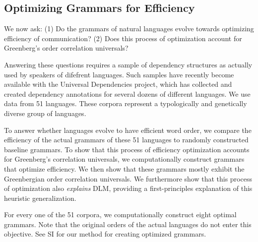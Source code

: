 \documentclass[9pt,twocolumn,twoside,lineno]{pnas-new}
\begin{document}
\subsection{Optimizing Grammars for Efficiency}

We now ask:
(1) Do the grammars of natural languages evolve towards optimizing efficiency of communication?
(2) Does this process of optimization account for Greenberg's order correlation universals?


Answering these questions requires a sample of dependency structures as actually used by speakers of difefrent languages.
Such samples have recently become available with the Universal Dependencies project, which has collected and created dependency annotations for several dozens of different languages.
We use data from 51 languages.
These corpora represent a typologically and genetically diverse group of languages.


To answer whether languages evolve to have efficient word order, we compare the efficiency of the actual grammars of these 51 languages to randomly constructed baseline grammars.
To show that this process of efficiency optimization accounts for Greenberg's correlation universals, we computationally construct grammars that optimize efficiency.
We then show that these grammars mostly exhibit the Greenbergian order correlation universals.
We furthermore show that this process of optimization also \emph{explains} DLM, providing a first-principles explanation of this heuristic generalization.


For every one of the 51 corpora, we computationally construct eight optimal grammars.
Note that the original orders of the actual languages do not enter this objective.
See SI for our method for creating optimized grammars.





%
%





\end{document}

